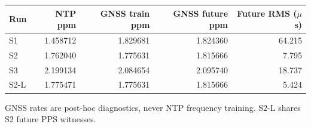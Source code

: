 \begin{center}\small
\begin{tabular}{lrrrr}\toprule
Run & NTP ppm & GNSS train ppm & GNSS future ppm & Future RMS ($\mu$s) \\ \midrule
S1 & 1.458712 & 1.829681 & 1.824360 & 64.215 \\
S2 & 1.762040 & 1.775631 & 1.815666 & 7.795 \\
S3 & 2.199134 & 2.084654 & 2.095740 & 18.737 \\
S2-L & 1.775471 & 1.775631 & 1.815666 & 5.424 \\
\bottomrule\end{tabular}\end{center}
{\small GNSS rates are post-hoc diagnostics, never NTP frequency training. S2-L shares S2 future PPS witnesses.}
